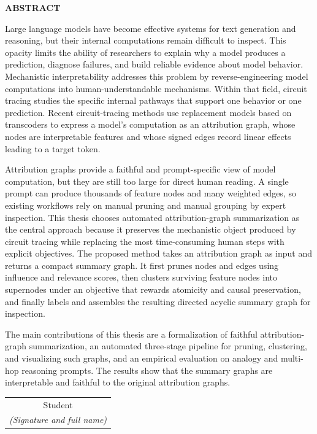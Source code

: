 \documentclass[../main.tex]{subfiles}
\begin{document}
\begin{center}
    \Large{\textbf{ABSTRACT}}\\
\end{center}
\vspace{1cm}
Large language models have become effective systems for text generation and reasoning, but
their internal computations remain difficult to inspect. This opacity limits the ability of
researchers to explain why a model produces a prediction, diagnose failures, and build
reliable evidence about model behavior. Mechanistic interpretability addresses this problem
by reverse-engineering model computations into human-understandable mechanisms. Within that
field, circuit tracing studies the specific internal pathways that support one behavior or
one prediction. Recent circuit-tracing methods use replacement models based on
transcoders to express a model's computation as an attribution graph, whose nodes are
interpretable features and whose signed edges record linear effects leading to a
target token.

Attribution graphs provide a faithful and prompt-specific view of model computation, but
they are still too large for direct human reading. A single prompt can produce thousands of
feature nodes and many weighted edges, so existing workflows rely on manual pruning and
manual grouping by expert inspection. This thesis chooses automated attribution-graph
summarization as the central approach because it preserves the mechanistic object produced
by circuit tracing while replacing the most time-consuming human steps with explicit
objectives. The proposed method takes an attribution graph as input and returns a compact
summary graph. It first prunes nodes and edges using influence and relevance scores, then
clusters surviving feature nodes into supernodes under an objective that rewards atomicity
and causal preservation, and finally labels and assembles the resulting directed acyclic
summary graph for inspection.

The main contributions of this thesis are a formalization of faithful attribution-graph
summarization, an automated three-stage pipeline for pruning, clustering, and visualizing
such graphs, and an empirical evaluation on analogy and multi-hop reasoning prompts. The
results show that the summary graphs are interpretable and faithful to the original attribution graphs.

\begin{flushright}
\begin{tabular}{@{}c@{}}
Student\\
\textit{(Signature and full name)}
\end{tabular}
\end{flushright}
\end{document}
